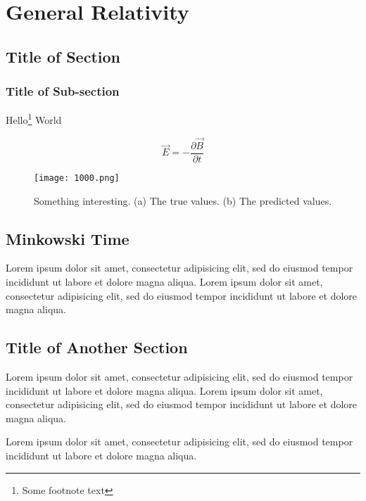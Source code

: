 \chapter{General Relativity}

\localtoc

\section{Title of Section}
\subsection{Title of Sub-section}

\lipsum[1]
Hello\footnote{Some footnote text} World
\lipsum[3-6]

\begin{equation}
\vec{E}=-\frac{\partial \vec{B}}{\partial t}
\end{equation}

\begin{figure}[tb]
  \centering
  \texttt{[image: 1000.png]}
  \caption{Something interesting. (a) The true values. (b) The predicted values.}
\end{figure}

\section{Minkowski Time}
\lipsum[22-23]
\lipsum[11-13]
\begin{aside}
  Lorem ipsum dolor sit amet, consectetur adipisicing elit, sed do eiusmod tempor incididunt ut labore et dolore magna aliqua. Lorem ipsum dolor sit amet, consectetur adipisicing elit, sed do eiusmod tempor incididunt ut labore et dolore magna aliqua.
\end{aside}

\section{Title of Another Section}
\lipsum[1]
\begin{aside}[Remark:]
  Lorem ipsum dolor sit amet, consectetur adipisicing elit, sed do eiusmod tempor incididunt ut labore et dolore magna aliqua. Lorem ipsum dolor sit amet, consectetur adipisicing elit, sed do eiusmod tempor incididunt ut labore et dolore magna aliqua.
\end{aside}

\lipsum[35]
\begin{textbox}
  Lorem ipsum dolor sit amet, consectetur adipisicing elit, sed do eiusmod tempor incididunt ut labore et dolore magna aliqua.
\end{textbox}


